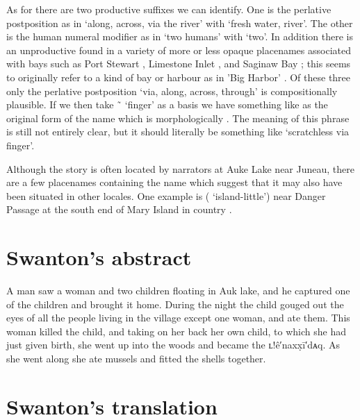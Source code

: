 As for  there are two productive  suffixes we can identify.
One  is the perlative postposition as in  ‘along, across, via the river’ with  ‘fresh water, river’.
The other  is the human numeral modifier as in  ‘two humans’ with  ‘two’.
In addition there is an unproductive  found in a variety of more or less opaque placenames associated with bays such as  Port Stewart \parencite[187 \#149]{thornton:2012},  Limestone Inlet \parencite[77 \#142]{thornton:2012}, and  Saginaw Bay \parencite[125, 136 \#133]{thornton:2012}; this seems to originally refer to a kind of bay or harbour as in  ’Big Harbor’ \parencite[170 \#119]{thornton:2012}.
Of these three only the perlative postposition  ‘via, along, across, through’ is compositionally plausible.
If we then take  \~\  ‘finger’ as a basis we have something like  as the original form of the name which is morphologically .
The meaning of this phrase is still not entirely clear, but it should literally be something like ‘scratchless via finger’.

Although the story is often located by narrators at  Auke Lake near Juneau, there are a few placenames containing the name  which suggest that it may also have been situated in other locales.
One example is  ( ‘island-little’) near Danger Passage at the south end of Mary Island in  country \parencite[202 \#675]{thornton:2012}.

\section{Swanton’s abstract}\label{sec:94-swanton-abstract}

A man saw a woman and two children floating in Auk lake, and he captured one of the children and brought it home.
During the night the child gouged out the eyes of all the people living in the village except one woman, and ate them.
This woman killed the child, and taking on her back her own child, to which she had just given birth, she went up into the woods and became the ʟ!ê′naxx̣ī′dᴀq.
As she went along she ate mussels and fitted the shells together.

\section{Swanton’s translation}\label{sec:94-swanton-translation}


